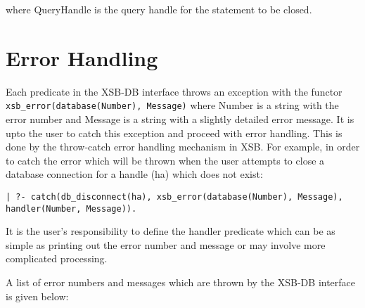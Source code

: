 where QueryHandle is the query handle for the statement to be closed.

\section{Error Handling}

Each predicate in the XSB-DB interface throws an exception with the functor 
{\tt xsb\_error(database(Number), Message)} where Number is a string with the 
error number and Message is a string with a slightly detailed error message.
It is upto the user to catch this exception
and proceed with error handling. This is done by the throw-catch error
handling mechanism in XSB. For example, in order to catch the error which
will be thrown when the user attempts to close a database connection for 
a handle (ha) which does not exist:

\begin{verbatim}
| ?- catch(db_disconnect(ha), xsb_error(database(Number), Message), 
handler(Number, Message)).
\end{verbatim}

It is the user's responsibility to define the handler predicate which can be as simple
as printing out the error number and message or may involve more 
complicated  processing.

A list of error numbers and messages which are thrown by the XSB-DB interface
is given below:

